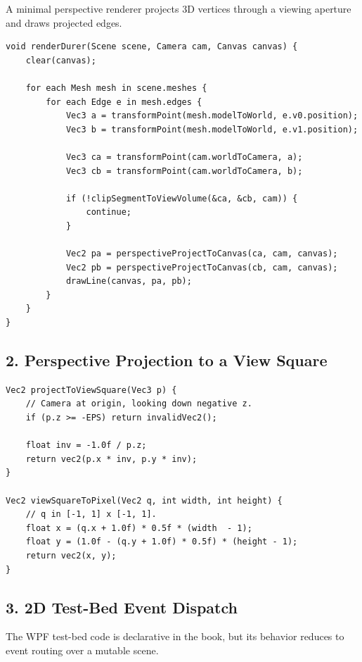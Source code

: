 \documentclass[10pt,letterpaper]{article}
\begin{document}
A minimal perspective renderer projects 3D vertices through a viewing aperture and draws projected edges.

\begin{verbatim}
void renderDurer(Scene scene, Camera cam, Canvas canvas) {
    clear(canvas);

    for each Mesh mesh in scene.meshes {
        for each Edge e in mesh.edges {
            Vec3 a = transformPoint(mesh.modelToWorld, e.v0.position);
            Vec3 b = transformPoint(mesh.modelToWorld, e.v1.position);

            Vec3 ca = transformPoint(cam.worldToCamera, a);
            Vec3 cb = transformPoint(cam.worldToCamera, b);

            if (!clipSegmentToViewVolume(&ca, &cb, cam)) {
                continue;
            }

            Vec2 pa = perspectiveProjectToCanvas(ca, cam, canvas);
            Vec2 pb = perspectiveProjectToCanvas(cb, cam, canvas);
            drawLine(canvas, pa, pb);
        }
    }
}
\end{verbatim}

\subsection{2. Perspective Projection to a View Square}

\begin{verbatim}
Vec2 projectToViewSquare(Vec3 p) {
    // Camera at origin, looking down negative z.
    if (p.z >= -EPS) return invalidVec2();

    float inv = -1.0f / p.z;
    return vec2(p.x * inv, p.y * inv);
}

Vec2 viewSquareToPixel(Vec2 q, int width, int height) {
    // q in [-1, 1] x [-1, 1].
    float x = (q.x + 1.0f) * 0.5f * (width  - 1);
    float y = (1.0f - (q.y + 1.0f) * 0.5f) * (height - 1);
    return vec2(x, y);
}
\end{verbatim}

\subsection{3. 2D Test-Bed Event Dispatch}

The WPF test-bed code is declarative in the book, but its behavior reduces to event routing over a mutable scene.
\end{document}
